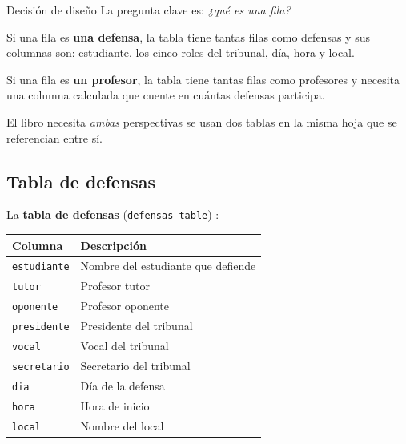 \documentclass[12pt,a4paper]{report}
\begin{document}
\begin{decisionbox}{Decisión de diseño}
La pregunta clave es: \emph{¿qué es una fila?}

Si una fila es \textbf{una defensa}, la tabla tiene tantas filas como
defensas  y sus columnas son: estudiante, los cinco roles del tribunal,
día, hora y local.

Si una fila es \textbf{un profesor}, la tabla tiene tantas filas como
profesores  y necesita una columna calculada que cuente en cuántas
defensas participa. 

{El libro} necesita \emph{ambas} perspectivas\quitaesto{:}  se usan dos tablas en la
misma hoja {que se referencian entre sí}.
\end{decisionbox}





\subsection{Tabla de defensas}


La \textbf{tabla de defensas} (\texttt{defensas-table}) :

\begin{center}
\begin{tabular}{ll}
\toprule
\textbf{Columna}     & \textbf{Descripción} \\
\midrule
\texttt{estudiante}  & Nombre del estudiante que defiende \\
\texttt{tutor}       & Profesor tutor \\
\texttt{oponente}    & Profesor oponente \\
\texttt{presidente}  & Presidente del tribunal \\
\texttt{vocal}       & Vocal del tribunal \\
\texttt{secretario}  & Secretario del tribunal \\
\texttt{dia}         & Día de la defensa \\
\texttt{hora}        & Hora de inicio \\
\texttt{local}       & Nombre del local \\
\bottomrule
\end{tabular}
\end{center}
\end{document}
